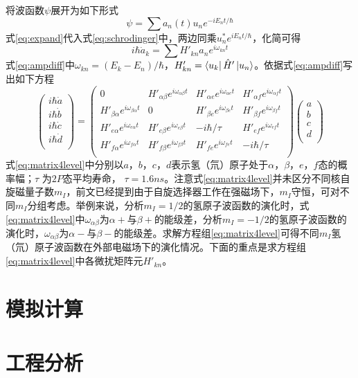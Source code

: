\documentclass[UTF8]{ctexart}
\newcommand{\beq}{\begin{equation}}
\newcommand{\eeq}{\end{equation}}
\begin{document}
将波函数$\psi$展开为如下形式
\beq\label{eq:expand}
\psi=\sum a_n(t) u_n e^{-iE_nt/{\hbar}}
\eeq
式\eqref{eq:expand}代入式\eqref{eq:schrodinger}中，两边同乘$u_n^* e^{iE_nt/\hbar}$，化简可得
\beq\label{eq:ampdiff}
i\hbar \dot{a}_k = \sum H'_{kn} a_n e^{i\omega_{kn}t}
\eeq
式\eqref{eq:ampdiff}中$\omega_{kn}=(E_k-E_n)/\hbar$，$H'_{kn}=\bra{u_k}\hat{H}'\ket{u_n}$。依据式\eqref{eq:ampdiff}写出如下方程
\beq\label{eq:matrix4level}
\left( \begin{array}{c}
i\hbar\dot{a}\\i\hbar\dot{b}\\i\hbar\dot{c}\\i\hbar\dot{d}\\ \end{array} \right)
=\left( \begin{array}{cccc}
0 & H'_{\alpha \beta}e^{i\omega_{\alpha \beta}t} & H'_{\alpha e}e^{i\omega_{\alpha e}t} & H'_{\alpha f}e^{i\omega_{\alpha f}t}\\
H'_{\beta \alpha}e^{i\omega_{\beta \alpha}t} & 0 & H'_{\beta e}e^{i\omega_{\beta e}t} & H'_{\beta f}e^{i\omega_{\beta f}t}\\
H'_{e \alpha}e^{i\omega_{e \alpha}t} & H'_{e \beta}e^{i\omega_{e \beta}t} & -i\hbar/\tau & H'_{ef}e^{i\omega_{ef}t}\\
H'_{f \alpha}e^{i\omega_{f \alpha}t} & H'_{f \beta}e^{i\omega_{f \beta}t} & H'_{fe}e^{i\omega_{fe}t} & -i\hbar/\tau\\
\end{array} \right)
\left(\begin{array}{c}
a \\ b \\ c \\ d \\
\end{array} \right)
\eeq
式\eqref{eq:matrix4level}中分别以$a$，$b$，$c$，$d$表示氢（氘）原子处于$\alpha$，$\beta$，$e$，$f$态的概率幅；$\tau$ 为$2P$态平均寿命， $\tau = 1.6ns$。注意式\eqref{eq:matrix4level}并未区分不同核自旋磁量子数$m_I$，前文已经提到由于自旋选择器工作在强磁场下，$m_I$守恒，可对不同$m_I$分组考虑。举例来说，分析$m_I=1/2$的氢原子波函数的演化时，式\eqref{eq:matrix4level}中$\omega_{\alpha \beta}$为$\alpha+$与$\beta+$的能级差，分析$m_I=-1/2$的氢原子波函数的演化时，$\omega_{\alpha \beta}$为$\alpha-$与$\beta-$的能级差。求解方程组\eqref{eq:matrix4level}可得不同$m_I$氢（氘）原子波函数在外部电磁场下的演化情况。下面的重点是求方程组\eqref{eq:matrix4level}中各微扰矩阵元$H'_{kn}$。


\section{模拟计算}

\section{工程分析}



\end{document}
